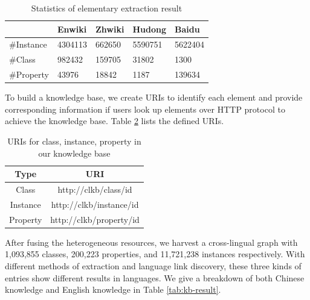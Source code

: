\documentclass[runningheads,a4paper]{llncs}
\begin{document}
\begin{table}[h]
\small
\centering
\caption{Statistics of elementary extraction result}
\label{tab:extract-result}
    \begin{tabular}{|l|l|l|l|l|}
        \hline
                 & Enwiki  & Zhwiki & Hudong  & Baidu   \\ \hline
        \#Instance & 4304113 & 662650 & 5590751 & 5622404 \\ \hline
        \#Class  & 982432  & 159705 & 31802   & 1300    \\ \hline
        \#Property & 43976   & 18842  & 1187    & 139634  \\ \hline
    \end{tabular}
\end{table}

To build a knowledge base, we create URIs to identify each element and provide corresponding information if users look up elements over HTTP protocol to achieve the knowledge base. Table \ref{tab:uris} lists the defined URIs.
\begin{table}[h]
\small
\centering
\caption{URIs for class, instance, property in our knowledge base}
\label{tab:uris}
    \begin{tabular}{|c|c|}
        \hline
        Type     & URI                     \\ \hline
        Class  & http://clkb/class/id  \\ \hline
        Instance & http://clkb/instance/id \\ \hline
        Property & http://clkb/property/id \\ \hline
    \end{tabular}
\end{table}

After fusing the heterogeneous resources, we harvest a cross-lingual graph with 1,093,855 classes, 200,223 properties, and 11,721,238 instances respectively. With different methods of extraction and language link discovery, these three kinds of entries show different results in languages. We give a breakdown of both Chinese knowledge and English knowledge in Table \ref{tab:kb-result}.
\end{document}
